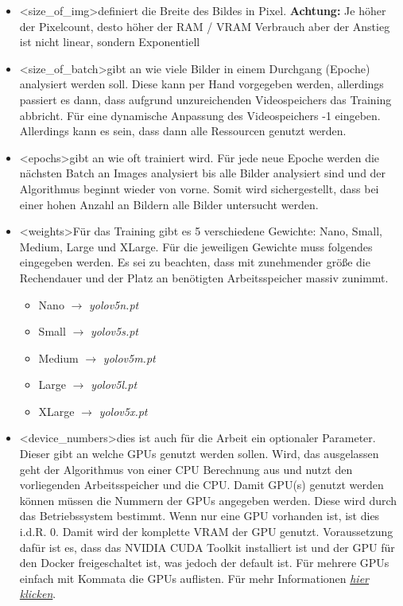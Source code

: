 \begin{itemize}
    \item \textless size\_of\_img\textgreater definiert die Breite des Bildes in Pixel. \textbf{Achtung:} Je höher der Pixelcount, desto höher der RAM / VRAM Verbrauch aber der Anstieg ist nicht linear, sondern Exponentiell
    \item \textless size\_of\_batch\textgreater gibt an wie viele Bilder in einem Durchgang (Epoche) analysiert werden soll. Diese kann per Hand vorgegeben werden, allerdings passiert es dann, dass aufgrund unzureichenden Videospeichers das Training abbricht. Für eine dynamische Anpassung des Videospeichers -1 eingeben. Allerdings kann es sein, dass dann alle Ressourcen genutzt werden.
    \item \textless epochs\textgreater gibt an wie oft trainiert wird. Für jede neue Epoche werden die nächsten Batch an Images analysiert bis alle Bilder analysiert sind und der Algorithmus beginnt wieder von vorne. Somit wird sichergestellt, dass bei einer hohen Anzahl an Bildern alle Bilder untersucht werden.
    \item \textless weights\textgreater Für das Training gibt es 5 verschiedene Gewichte: Nano, Small, Medium, Large und XLarge. Für die jeweiligen Gewichte muss folgendes eingegeben werden. Es sei zu beachten, dass mit zunehmender größe die Rechendauer und der Platz an benötigten Arbeitsspeicher massiv zunimmt.
    \begin{itemize}
        \item Nano $\rightarrow $ \textit{yolov5n.pt}
        \item Small $\rightarrow $ \textit{yolov5s.pt}
        \item Medium $\rightarrow $ \textit{yolov5m.pt}
        \item Large $\rightarrow $ \textit{yolov5l.pt}
        \item XLarge $\rightarrow $ \textit{yolov5x.pt}
    \end{itemize}
    \item \textless device\_numbers\textgreater dies ist auch für die Arbeit ein optionaler Parameter. Dieser gibt an welche GPUs genutzt werden sollen. Wird, das ausgelassen geht der Algorithmus von einer CPU Berechnung aus und nutzt den vorliegenden Arbeitsspeicher und die CPU. Damit GPU(s) genutzt werden können müssen die Nummern der GPUs angegeben werden. Diese wird durch das Betriebssystem bestimmt. Wenn nur eine GPU vorhanden ist, ist dies i.d.R. 0. Damit wird der komplette VRAM der GPU genutzt. Voraussetzung dafür ist es, dass das NVIDIA CUDA Toolkit installiert ist und der GPU für den Docker freigeschaltet ist, was jedoch der default ist. Für mehrere GPUs einfach mit Kommata die GPUs auflisten. Für mehr Informationen \textit{\href{https://github.com/ultralytics/yolov5/issues/475}{hier klicken}}.
\end{itemize}

